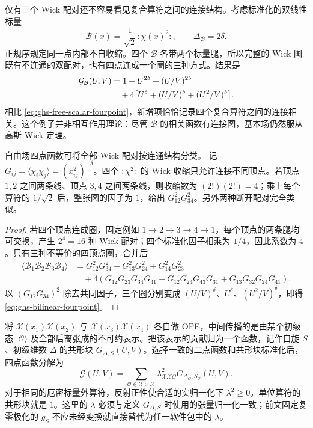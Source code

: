仅有三个 Wick 配对还不容易看见复合算符之间的连接结构。考虑标准化的双线性标量
\begin{equation}\label{eq:ghs-normalized-phi2}
 \mathcal B(x)=\frac1{\sqrt2}:\!\chi(x)^2\!:,
 \qquad\Delta_\mathcal B=2\delta.
\end{equation}
正规序规定同一点内部不自收缩。四个 $\mathcal B$ 各带两个标量腿，所以完整的 Wick 图既有不连通的双配对，也有四点连成一个圈的三种方式。结果是
\begin{align}\label{eq:ghs-bilinear-fourpoint}
 \mathcal G_\mathcal B(U,V)
 &=1+U^{2\delta}+(U/V)^{2\delta}\\
 &\quad+4\bigl[U^\delta+(U/V)^\delta+(U^2/V)^\delta\bigr].\notag
\end{align}
相比 \cref{eq:ghs-free-scalar-fourpoint}，新增项恰恰记录四个复合算符之间的连接相关。这个例子并非相互作用理论：尽管 $\mathcal B$ 的相关函数有连接图，基本场仍然服从高斯 Wick 定理。


自由场四点函数可将全部 Wick 配对按连通结构分类。
记 $G_{ij}=\langle\chi_i\chi_j\rangle=(x_{ij}^2)^{-\delta}$。四个 $:\!\chi^2\!:$ 的 Wick 收缩只允许连接不同顶点。若顶点 $1,2$ 之间两条线、顶点 $3,4$ 之间两条线，则收缩数为 $(2!)(2!)=4$；乘上每个算符的 $1/\sqrt2$ 后，整张图的因子为 $1$，给出 $G_{12}^2G_{34}^2$。另外两种断开配对完全类似。

\begin{proof}
若四个顶点连成圈，固定例如 $1\to2\to3\to4\to1$，每个顶点的两条腿均可交换，产生 $2^4=16$ 种 Wick 配对；四个标准化因子相乘为 $1/4$，因此系数为 $4$。只有三种不等价的四顶点圈，合并后
\begin{align*}
\langle\mathcal B_1\mathcal B_2\mathcal B_3\mathcal B_4\rangle
&=G_{12}^2G_{34}^2+G_{13}^2G_{24}^2+G_{14}^2G_{23}^2\\
&\quad+4(G_{12}G_{23}G_{34}G_{41}
+G_{12}G_{24}G_{43}G_{31}
+G_{13}G_{32}G_{24}G_{41}).
\end{align*}
以 $(G_{12}G_{34})^2$ 除去共同因子，三个圈分别变成 $(U/V)^\delta$、$U^\delta$、$(U^2/V)^\delta$，即得 \cref{eq:ghs-bilinear-fourpoint}。
\end{proof}

将 $\mathcal X(x_1)\mathcal X(x_2)$ 与 $\mathcal X(x_3)\mathcal X(x_4)$ 各自做 OPE，中间传播的是由某个初级态 $|\mathcal O\rangle$ 及全部后裔张成的不可约表示。把该表示的贡献归为一个函数，记作自旋 $S$、初级维数 $\Delta$ 的共形块 $G_{\Delta,S}(U,V)$。选择一致的二点函数和共形块标准化后，四点函数分解为
\begin{equation}\label{eq:ghs-conformal-block-expansion}
 \mathcal G(U,V)=\sum_{\mathcal O\in\mathcal X\times\mathcal X}
 \lambda_{\mathcal X\mathcal X\mathcal O}^2
 G_{\Delta_\mathcal O,S_\mathcal O}(U,V).
\end{equation}
对于相同的厄密标量外算符，反射正性使合适的实归一化下 $\lambda^2\ge0$。单位算符的共形块就是 $1$。这里的 $\lambda$ 必须与定义 $G_{\Delta,S}$ 时使用的张量归一化一致；前文固定复零极化的 $g_S$ 不应未经变换就直接替代为任一软件包中的 $\lambda$。

